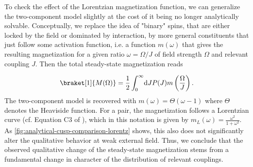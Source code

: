 To check the effect of the Lorentzian magnetization function, we can generalize the two-component model slightly at the cost of it being no longer analytically solvable. Conceptually, we replace the idea of "binary" spins, that are either locked by the field or dominated by interaction, by more general constituents that just follow some activation function, i.e. a function $m(\omega)$ that gives the resulting magnetization for a given ratio $\omega=\Omega/J$ of field strength $\Omega$ and relevant coupling $J$. Then the total steady-state magnetization reads

\begin{equation}\label{eq:generalized-two-component-model}
	\braket[1]{M(\Omega)} = \frac{1}{2}\int_0^{\infty}\!\mathrm{d}J P(J)m\left(\frac{\Omega}{J}\right).
\end{equation}
The two-component model is recovered with $m(\omega)=\Theta(\omega - 1)$ where $\Theta$ denotes the Heaviside function. For a pair, the magnetization follows a Lorentzian curve (cf. Equation C3 of \cite{franzEmergentPairLocalization2024}), which in this notation is given by $m_L(\omega) = \frac{\omega^2}{1+\omega^2}$. As \autoref{fig:analytical-cusp-comparison-lorentz} shows, this also does not significantly alter the qualitative behavior at weak external field. Thus, we conclude that the observed qualitative change of the steady-state magnetization stems from a fundamental change in character of the distribution of relevant couplings.
